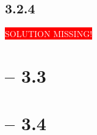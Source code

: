\documentclass[a4paper,
			llpt,
			solution,
			accentcolor=tud2d,
			colorbacktitle
			]
			{tudexercise}
\newcommand{\8}{$\infty$}
\begin{document}
\subsection{3.2.4}
\colorbox{red}{\textcolor{white}{SOLUTION MISSING!}}
\section{ -- 3.3}
\section{ -- 3.4}
\end{document}
